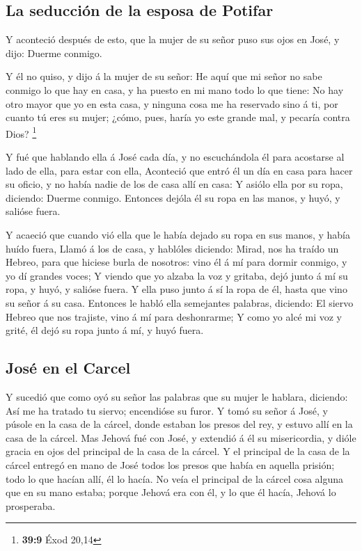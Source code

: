 \hypertarget{la-seducciuxf3n-de-la-esposa-de-potifar}{%
\subsection{La seducción de la esposa de
Potifar}\label{la-seducciuxf3n-de-la-esposa-de-potifar}}

 Y aconteció después de esto, que la mujer de su señor puso
sus ojos en José, y dijo: Duerme conmigo.

 Y él no quiso, y dijo á la mujer de su señor: He aquí que
mi señor no sabe conmigo lo que hay en casa, y ha puesto en mi mano todo
lo que tiene:  No hay otro mayor que yo en esta casa, y
ninguna cosa me ha reservado sino á ti, por cuanto tú eres su mujer;
¿cómo, pues, haría yo este grande mal, y pecaría contra Dios?
\footnote{\textbf{39:9} Éxod 20,14}

 Y fué que hablando ella á José cada día, y no escuchándola
él para acostarse al lado de ella, para estar con ella, 
Aconteció que entró él un día en casa para hacer su oficio, y no había
nadie de los de casa allí en casa:  Y asiólo ella por su
ropa, diciendo: Duerme conmigo. Entonces dejóla él su ropa en las manos,
y huyó, y salióse fuera.

 Y acaeció que cuando vió ella que le había dejado su ropa
en sus manos, y había huído fuera,  Llamó á los de casa, y
hablóles diciendo: Mirad, nos ha traído un Hebreo, para que hiciese
burla de nosotros: vino él á mí para dormir conmigo, y yo dí grandes
voces;  Y viendo que yo alzaba la voz y gritaba, dejó junto
á mí su ropa, y huyó, y salióse fuera.  Y ella puso junto á
sí la ropa de él, hasta que vino su señor á su casa. 
Entonces le habló ella semejantes palabras, diciendo: El siervo Hebreo
que nos trajiste, vino á mí para deshonrarme;  Y como yo
alcé mi voz y grité, él dejó su ropa junto á mí, y huyó fuera.

\hypertarget{josuxe9-en-el-carcel}{%
\subsection{José en el Carcel}\label{josuxe9-en-el-carcel}}

 Y sucedió que como oyó su señor las palabras que su mujer
le hablara, diciendo: Así me ha tratado tu siervo; encendióse su furor.
 Y tomó su señor á José, y púsole en la casa de la cárcel,
donde estaban los presos del rey, y estuvo allí en la casa de la cárcel.
 Mas Jehová fué con José, y extendió á él su misericordia,
y dióle gracia en ojos del principal de la casa de la cárcel.
 Y el principal de la casa de la cárcel entregó en mano de
José todos los presos que había en aquella prisión; todo lo que hacían
allí, él lo hacía.  No veía el principal de la cárcel cosa
alguna que en su mano estaba; porque Jehová era con él, y lo que él
hacía, Jehová lo prosperaba.


